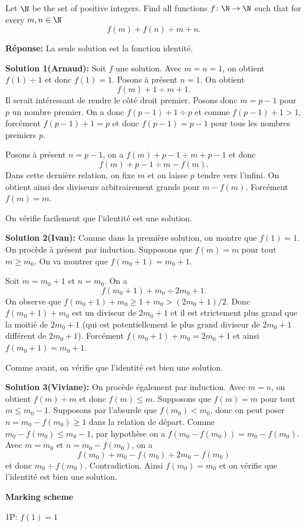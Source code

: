 Let $\N$ be the set of positive integers. Find all functions $f\colon\N\to\N$ such that for every $m,n\in \N$
\[
f(m)+f(n)\div m+n.
\]

\textbf{Réponse:} La seule solution est la fonction identité.

\textbf{Solution 1(Arnaud):}
Soit $f$ une solution. Avec $m=n=1$, on obtient $f(1)\div 1$ et donc $f(1)=1$. Posons à présent $n=1$. On obtient 
\[
f(m)+1\div m+1.
\]
Il serait intéressant de rendre le côté droit premier. Posons donc $m=p-1$ pour $p$ un nombre premier. On a donc $f(p-1)+1\div p$ et comme $f(p-1)+1>1$, forcément $f(p-1)+1=p$ et donc $f(p-1)=p-1$ pour tous les nombres premiers $p$.

Posons à présent $n=p-1$, on a $f(m)+p-1\div m+p-1$ et donc
\[
f(m)+p-1\div m-f(m).
\]
Dans cette dernière relation, on fixe $m$ et on laisse $p$ tendre vers l'infini. On obtient ainsi des diviseurs arbitrairement grands pour $m-f(m)$. Forcément $f(m)=m$.

On vérifie facilement que l'identité est une solution.

\textbf{Solution 2(Ivan):}
Comme dans la première solution, on montre que $f(1)=1$. On procède à présent par induction. Supposons que $f(m)=m$ pour tout $m\geq m_0$. On va montrer que $f(m_0+1)=m_0+1$.

Soit $m=m_0+1$ et $n=m_0$. On a 
\[
f(m_0+1)+m_0\div 2m_0+1.
\]
On observe que $f(m_0+1)+m_0\geq 1+m_0> (2m_0+1)/2$. Donc $f(m_0+1)+m_0$ est un diviseur de $2m_0+1$ et il est strictement plus grand que la moitié de $2m_0+1$ (qui est potentiellement le plus grand diviseur de $2m_0+1$ différent de $2m_0+1$). Forcément $f(m_0+1)+m_0=2m_0+1$ et ainsi $f(m_0+1)=m_0+1$.

Comme avant, on vérifie que l'identité est bien une solution.

\textbf{Solution 3(Viviane):}
On procède également par induction. Avec $m=n$, on obtient $f(m)\div m$ et donc $f(m)\leq m$. Supposons que $f(m)=m$ pour tout $m\leq m_0-1$. Supposons par l'absurde que $f(m_0)<m_0$, donc on peut poser $n=m_0-f(m_0)\geq 1$ dans la relation de départ. Comme $m_0-f(m_0)\leq m_0-1$, par hypothèse on a $f(m_0-f(m_0))=m_0-f(m_0)$. Avec $m=m_0$ et $n=m_0-f(m_0)$, on a
\[
f(m_0)+m_0-f(m_0)\div 2m_0-f(m_0)
\]
et donc $m_0\div f(m_0)$. Contradiction. Ainsi $f(m_0)=m_0$ et on vérifie que l'identité est bien une solution.

\newpage

\textbf{Marking scheme}

1P: $f(1)=1$


